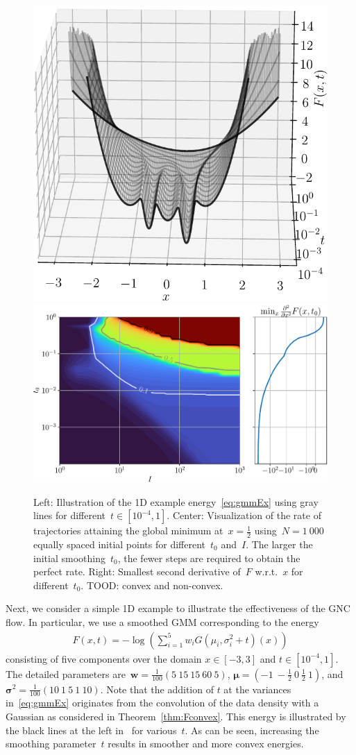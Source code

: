 \documentclass{article}
\theoremstyle{plain}
\theoremstyle{definition}
\theoremstyle{remark}
\begin{document}
\begin{figure}[th]
\centering
\includegraphics[width=.35\linewidth]{./figures/ex_gmm/ex_gmm_func}
\includegraphics[width=.6\linewidth]{./figures/ex_gmm/ex_gmm_rate}
\label{fig:gmmOptimization}
\caption{Left: Illustration of the 1D example energy~\eqref{eq:gmmEx} using gray lines for different~$t\in[10^{-4},1]$.
Center: Visualization of the rate of trajectories attaining the global minimum at~$x=\frac{1}{2}$ using~$N=1\ 000$ equally spaced initial points for different~$t_0$ and~$I$.
The larger the initial smoothing~$t_0$, the fewer steps are required to obtain the perfect rate.
Right: Smallest second derivative of~$F$ w.r.t.~$x$ for different~$t_0$. TOOD: convex and non-convex.
}
\end{figure}
Next, we consider a simple 1D example to illustrate the effectiveness of the GNC flow.
In particular, we use a smoothed GMM corresponding to the energy
\begin{align} \label{eq:gmmEx}
F(x,t)=-\log\left(\sum_{i=1}^5 w_i G\left(\mu_i,\sigma_i^2+t\right)(x)\right)
\end{align}
consisting of five components over the domain $x\in[-3,3]$ and $t\in[10^{-4},1]$.
The detailed parameters are~$\bm{w}=\tfrac{1}{100}(5\ 15\ 15\ 60\ 5)$, $\bm{\mu}=(-1\ -\tfrac12\ 0\ \tfrac12\ 1)$, and $\bm{\sigma}^2=\tfrac{1}{100}(10\ 1\ 5\ 1\ 10)$.
Note that the addition of $t$ at the variances in~\eqref{eq:gmmEx} originates from the convolution of the data density with a Gaussian as considered in Theorem~\ref{thm:Fconvex}.
This energy is illustrated by the black lines at the left in~ for various~$t$.
As can be seen, increasing the smoothing parameter~$t$ results in smoother and more convex energies.
\end{document}
